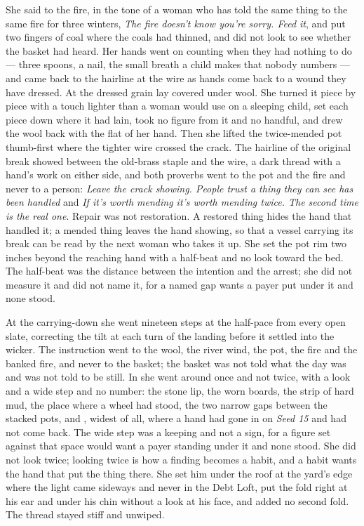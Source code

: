 She said to the fire, in the tone of a woman who has told the same thing to the same fire for three winters, \emph{The fire doesn't know you're sorry. Feed it}, and put two fingers of coal where the coals had thinned, and did not look to see whether the basket had heard. Her hands went on counting when they had nothing to do --- three spoons, a nail, the small breath a child makes that nobody numbers --- and came back to the hairline at the wire as hands come back to a wound they have dressed. At  the dressed grain lay covered under wool. She turned it piece by piece with a touch lighter than a woman would use on a sleeping child, set each piece down where it had lain, took no figure from it and no handful, and drew the wool back with the flat of her hand. Then she lifted the twice-mended pot thumb-first where the tighter wire crossed the crack. The hairline of the original break showed between the old-brass staple and the wire, a dark thread with a hand's work on either side, and both proverbs went to the pot and the fire and never to a person: \emph{Leave the crack showing. People trust a thing they can see has been handled} and \emph{If it's worth mending it's worth mending twice. The second time is the real one}. Repair was not restoration. A restored thing hides the hand that handled it; a mended thing leaves the hand showing, so that a vessel carrying its break can be read by the next woman who takes it up. She set the pot rim two inches beyond the reaching hand with a half-beat and no look toward the bed. The half-beat was the distance between the intention and the arrest; she did not measure it and did not name it, for a named gap wants a payer put under it and none stood.

At the carrying-down she went nineteen steps at the half-pace from every open slate, correcting the tilt at each turn of the landing before it settled into the wicker. The instruction went to the wool, the river wind, the pot, the fire and the banked fire, and never to the basket; the basket was not told what the day was and was not told to be still. In  she went around  once and not twice, with a look and a wide step and no number: the stone lip, the worn boards, the strip of hard mud, the place where a wheel had stood, the two narrow gaps between the stacked pots, and , widest of all, where a hand had gone in on \emph{Seed 15} and had not come back. The wide step was a keeping and not a sign, for a figure set against that space would want a payer standing under it and none stood. She did not look twice; looking twice is how a finding becomes a habit, and a habit wants the hand that put the thing there. She set him under the roof at the yard's edge where the light came sideways and never in the Debt Loft, put the fold right at his ear and under his chin without a look at his face, and added no second fold. The thread stayed stiff and unwiped.

